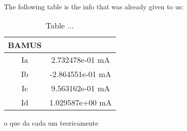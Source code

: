 The following table is the info that was already given to us:

\begin{table}
\centering
\begin{tabular}{c|c} 
 \hline
 BAMUS\\ [0.5ex] 
 \hline\hline
Ia & 2.732478e-01 mA\\ \hline
Ib & -2.864551e-01 mA\\ \hline
Ic & 9.563162e-01 mA\\ \hline
Id & 1.029587e+00 mA\\ \hline 
\end{tabular}
\caption{Table ...}
\label{table:3}
\end{table}


o que da cada um teoricamente
















